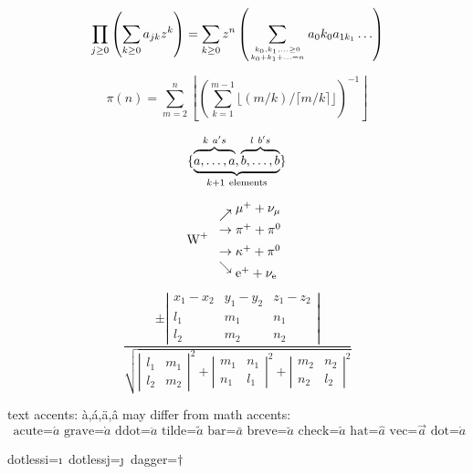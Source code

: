 \documentclass[11pt]{article}
\begin{document}
\begin{equation}
  \prod_{j\geq 0}
  \left(\sum_{k\geq 0}a_{jk} z^k\right) 
= \sum_{k\geq 0} z^n
  \left( \sum_{{k_0,k_1,\ldots\geq 0}
          \atop{k_0+k_1+\ldots=n}    }
        a{_0k_0}a_{1k_1}\ldots  \right) 
\end{equation}

\begin{equation}
\pi(n) = \sum_{m=2}^{n}
  \left\lfloor \left(\sum_{k=1}^{m-1}
       \lfloor(m/k)/\lceil m/k\rceil 
       \rfloor \right)^{-1}
  \right\rfloor
\end{equation}

\begin{equation}
\{\underbrace{%
    \overbrace{\mathstrut a,\ldots,a}^{k\ a's},
    \overbrace{\mathstrut b,\ldots,b}^{l\ b's}}
  _{k+1\ \mathrm{elements}}                   \}
\end{equation}

\begin{displaymath}
\mbox{W}^+\
\begin{array}{l}
\nearrow\raise5pt\hbox{$\mu^+ + \nu_{\mu}$}\\
\rightarrow         \pi^+ +\pi^0         \\[5pt]
\rightarrow \kappa^+ +\pi^0              \\
\searrow\lower5pt\hbox{$\mathrm{e}^+ 
          +\nu_{\scriptstyle\mathrm{e}}$}
\end{array}
\end{displaymath}

\begin{displaymath}
\frac{\pm
\left|\begin{array}{ccc}
x_1-x_2  & y_1-y_2 & z_1-z_2 \\
l_1      & m_1     & n_1     \\
l_2      & m_2     & n_2
\end{array}\right|}{
\sqrt{\left|\begin{array}{cc}l_1&m_1\\
l_2&m_2\end{array}\right|^2
+     \left|\begin{array}{cc}m_1&n_1\\
n_1&l_1\end{array}\right|^2
+     \left|\begin{array}{cc}m_2&n_2\\
n_2&l_2\end{array}\right|^2}}
\end{displaymath}

text accents: \`{a},\'{a},\"{a},\^{a}
may differ from math accents:
\begin{displaymath}
\mbox{ acute=}\acute{a}
\mbox{ grave=}\grave{a}
\mbox{ ddot=}\ddot {a}
\mbox{ tilde=}\tilde{a}
\mbox{ bar=}\bar  {a}
\mbox{ breve=}\breve{a}
\mbox{ check=}\check{a}
\mbox{ hat=}\hat  {a}
\mbox{ vec=}\vec  {a}
\mbox{ dot=}\dot  {a}
\end{displaymath}

dotlessi=\i\ 
dotlessj=\j\ 
dagger=$\dagger$\ \ \ 

\end{document}
